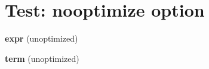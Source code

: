\documentclass{article}
\begin{document}
\section*{Test: nooptimize option}

\bigskip
\noindent\textbf{expr} (unoptimized)
\par\medskip
{}

\bigskip
\noindent\textbf{term} (unoptimized)
\par\medskip
{}
\end{document}
